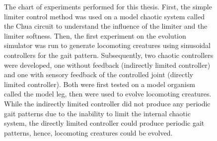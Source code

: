 \documentclass[main]{subfiles}
\begin{document}
\begin{figure}[H]
\centering
\hspace*{-7em}


\caption[The experiments chart]{The chart of experiments performed for this thesis. First, the simple limiter control method was used on a model chaotic system called the Chua circuit to understand the influence of the limiter and the limiter softness. Then, the first experiment on the evolution simulator was run to generate locomoting creatures using sinusoidal controllers for the gait pattern. Subsequently, two chaotic controllers were developed, one without feedback (indirectly limited controller) and one with sensory feedback of the controlled joint (directly limited controller). Both were first tested on a model organism called the model leg, then were used to evolve locomoting creatures. While the indirectly limited controller did not produce any periodic gait patterns due to the inability to limit the internal chaotic system, the directly limited controller could produce periodic gait patterns, hence, locomoting creatures could be evolved.}
\label{figure:experiments-chart}
\end{figure}
\end{document}
